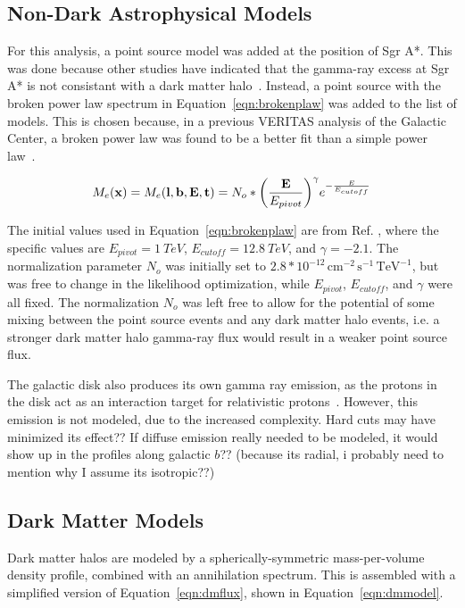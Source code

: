   \subsection{Non-Dark Astrophysical Models}\label{subsec:gcpointsrc}
  For this analysis, a point source model was added at the position of Sgr A*.
  This was done because other studies have indicated that the gamma-ray excess at Sgr A* is not consistant with a dark matter halo~\cite{gc_pnt_is_not_dm1, gc_pnt_is_not_dm2, gc_pnt_is_not_dm3}.
  Instead, a point source with the broken power law spectrum in Equation~\ref{eqn:brokenplaw} was added to the list of models.
  This is chosen because, in a previous VERITAS analysis of the Galactic Center, a broken power law was found to be a better fit than a simple power law~\cite{VeritasGCRidge2015}.
  
  \begin{equation}\label{eqn:brokenplaw}
    M_e(\mathbf{x }) = M_e(\mathbf{l },\mathbf{b },\mathbf{E },\mathbf{t }) = N_o * { \left ( \frac{\mathbf{E }}{E_{pivot}} \right ) }^{\gamma} {e}^{-\frac{E}{E_{cutoff}}}
  \end{equation}
  
  The initial values used in Equation~\ref{eqn:brokenplaw} are from Ref. \cite{VeritasGCRidge2015}, where the specific values are $E_{pivot}=\SI{1}{TeV}$, $E_{cutoff}=\SI{12.8}{TeV}$, and $\gamma=-2.1$.
  The normalization parameter $N_o$ was initially set to $2.8*{10}^{-12}\,\text{cm}^{-2}\,\text{s}^{-1}\,\text{TeV}^{-1}$, but was free to change in the likelihood optimization, while $E_{pivot}$, $E_{cutoff}$, and $\gamma$ were all fixed.
  The normalization $N_o$ was left free to allow for the potential of some mixing between the point source events and any dark matter halo events, i.e. a stronger dark matter halo gamma-ray flux would result in a weaker point source flux.
  
  The galactic disk also produces its own gamma ray emission, as the protons in the disk act as an interaction target for relativistic protons~\cite{tevgev_gc_diffuse}.
  However, this emission is not modeled, due to the increased complexity.
  {\color{red}
  Hard cuts may have minimized its effect??
  If diffuse emission really needed to be modeled, it would show up in the profiles along galactic $b$??
  (because its radial, i probably need to mention why I assume its isotropic??)
  }
  
  \subsection{Dark Matter Models}\label{subsec:dmhalomodel}
  Dark matter halos are modeled by a spherically-symmetric mass-per-volume density profile, combined with an annihilation spectrum.
  This is assembled with a simplified version of Equation~\ref{eqn:dmflux}, shown in Equation~\ref{eqn:dmmodel}.
  
